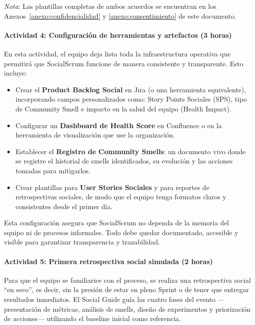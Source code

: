 \emph{Nota}: Las plantillas completas de ambos acuerdos se encuentran en los Anexos~\ref{anexo:confidencialidad} y \ref{anexo:consentimiento} de este documento.

\paragraph{Actividad 4: Configuración de herramientas y artefactos (3 horas)}

En esta actividad, el equipo deja lista toda la infraestructura operativa que permitirá que SocialScrum funcione de manera consistente y transparente. Esto incluye:

\begin{itemize}
    \item Crear el \textbf{Product Backlog Social} en Jira (o una herramienta equivalente), incorporando campos personalizados como: Story Points Sociales (SPS), tipo de Community Smell e impacto en la salud del equipo (Health Impact).
    \item Configurar un \textbf{Dashboard de Health Score} en Confluence o en la herramienta de visualización que use la organización.
    \item Establecer el \textbf{Registro de Community Smells}: un documento vivo donde se registre el historial de smells identificados, su evolución y las acciones tomadas para mitigarlos.
    \item Crear plantillas para \textbf{User Stories Sociales} y para reportes de retrospectivas sociales, de modo que el equipo tenga formatos claros y consistentes desde el primer día.
\end{itemize}

Esta configuración asegura que SocialScrum no dependa de la memoria del equipo ni de procesos informales. Todo debe quedar documentado, accesible y visible para garantizar transparencia y trazabilidad.

\paragraph{Actividad 5: Primera retrospectiva social simulada (2 horas)}

Para que el equipo se familiarice con el proceso, se realiza una retrospectiva social “en seco”, es decir, sin la presión de estar en pleno Sprint o de tener que entregar resultados inmediatos. El Social Guide guía las cuatro fases del evento —presentación de métricas, análisis de smells, diseño de experimentos y priorización de acciones— utilizando el baseline inicial como referencia.

